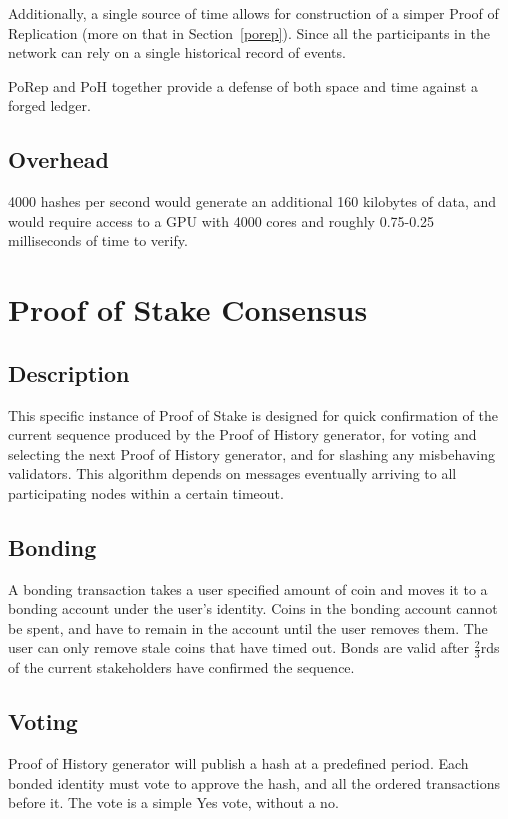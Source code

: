 \documentclass[12pt]{article}
\begin{document}
Additionally, a single source of time allows for construction of a simper Proof of Replication (more on that in Section~\ref{porep}). Since all the participants in the network can rely on a single historical record of events.

PoRep and PoH together provide a defense of both space and time against a forged ledger.

\subsection{Overhead}
4000 hashes per second would generate an additional 160 kilobytes of data, and would require access to a GPU with 4000 cores and roughly 0.75-0.25 milliseconds of time to verify.

\section{Proof of Stake Consensus}\label{proof_of_stake}
\subsection{Description}
This specific instance of Proof of Stake is designed for quick confirmation of the current sequence produced by the Proof of History generator, for voting and selecting the next Proof of History generator, and for slashing any misbehaving validators. This algorithm depends on messages eventually arriving to all participating nodes within a certain timeout.
\subsection{Bonding}
A bonding transaction takes a user specified amount of coin and moves it to a bonding account under the user’s identity. Coins in the bonding account cannot be spent, and have to remain in the account until the user removes them. The user can only remove stale coins that have timed out. Bonds are valid after \(\frac{2}{3}\)rds of the current stakeholders have confirmed the sequence.

\subsection{Voting}
Proof of History generator will publish a hash at a predefined period. Each bonded identity must vote to approve the hash, and all the ordered transactions before it. The vote is a simple Yes vote, without a no.
\end{document}
